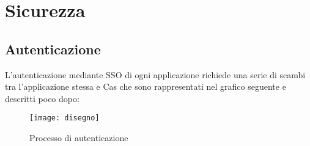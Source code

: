 \chapter{Sicurezza}

\section{Autenticazione}
L'autenticazione  mediante SSO di ogni applicazione richiede una serie di scambi tra l'applicazione stessa e Cas che sono rappresentati nel grafico seguente e descritti poco dopo:

\begin{figure}[h!]
  \centering
    \texttt{[image: disegno]} 
  \caption[cas]{Processo di autenticazione \label{fig:cas}}
\end{figure}


